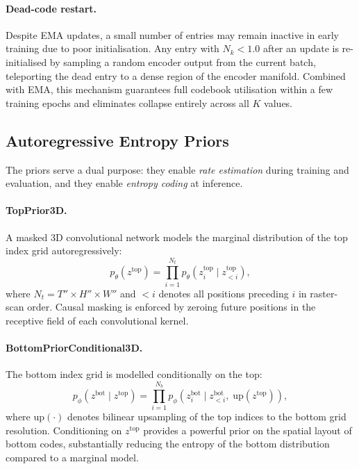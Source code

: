 \documentclass{article}
\begin{document}
\paragraph{Dead-code restart.}
Despite EMA updates, a small number of entries may remain inactive in early
training due to poor initialisation.
Any entry with $N_k < 1.0$ after an update is re-initialised by sampling a
random encoder output from the current batch, teleporting the dead entry to a
dense region of the encoder manifold.
Combined with EMA, this mechanism guarantees full codebook utilisation within
a few training epochs and eliminates collapse entirely across all $K$ values.

\subsection{Autoregressive Entropy Priors}
\label{sec:priors}

The priors serve a dual purpose: they enable \emph{rate estimation} during
training and evaluation, and they enable \emph{entropy coding} at inference.

\paragraph{TopPrior3D.}
A masked 3D convolutional network models the marginal distribution of the top
index grid autoregressively:
\begin{equation}
  p_\theta(z^{\mathrm{top}}) = \prod_{i=1}^{N_t}
    p_\theta\!\left(z^{\mathrm{top}}_i \;\big|\; z^{\mathrm{top}}_{<i}\right),
\end{equation}
where $N_t = T''\!\times\!H''\!\times\!W''$ and $<i$ denotes all positions
preceding $i$ in raster-scan order.
Causal masking is enforced by zeroing future positions in the receptive field
of each convolutional kernel.

\paragraph{BottomPriorConditional3D.}
The bottom index grid is modelled conditionally on the top:
\begin{equation}
  p_\phi(z^{\mathrm{bot}} \mid z^{\mathrm{top}}) = \prod_{i=1}^{N_b}
    p_\phi\!\left(z^{\mathrm{bot}}_i \;\big|\; z^{\mathrm{bot}}_{<i},\;
    \mathrm{up}(z^{\mathrm{top}})\right),
\end{equation}
where $\mathrm{up}(\cdot)$ denotes bilinear upsampling of the top indices
to the bottom grid resolution.
Conditioning on $z^{\mathrm{top}}$ provides a powerful prior on the
spatial layout of bottom codes, substantially reducing the entropy of the
bottom distribution compared to a marginal model.
\end{document}
